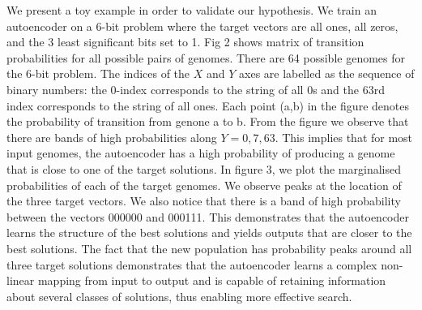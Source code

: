 \documentclass[runningheads,a4paper]{llncs}
\begin{document}
We present a toy example in order to validate our hypothesis. We train an autoencoder on a 6-bit problem where the target vectors are all ones, all zeros, and the 3 least significant bits set to 1. Fig 2 shows matrix of transition probabilities for all possible pairs of genomes. There are 64 possible genomes for the 6-bit problem. The indices of the $X$ and $Y$ axes are labelled as the sequence of binary numbers: the 0-index corresponds to the string of all 0s and the 63rd index corresponds to the string of all ones. Each point (a,b) in the figure denotes the probability of transition from genone a to b. From the figure we observe that there are bands of high probabilities along $Y=0,7,63$. This implies that for most input genomes, the autoencoder has a high probability of producing a genome that is close to one of the target solutions. In figure 3, we plot the marginalised probabilities of each of the target genomes. We observe peaks at the location of the three target vectors. We also notice that there is a band of high probability between the vectors 000000 and 000111. This demonstrates that the autoencoder learns the structure of the best solutions and yields outputs that are closer to the best solutions. The fact that the new population has probability peaks around all three target solutions demonstrates that the autoencoder learns a complex non-linear mapping from input to output and is capable of retaining information about several classes of solutions, thus enabling more effective search.  

\end{document}

